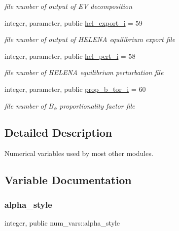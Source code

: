 \begin{DoxyCompactItemize}
\begin{DoxyCompactList}\small\item\em file number of output of EV decomposition \end{DoxyCompactList}\item 
integer, parameter, public \hyperlink{namespacenum__vars_ac781aa60ad67117abaff9737745e53f1}{hel\+\_\+export\+\_\+i} = 59
\begin{DoxyCompactList}\small\item\em file number of output of H\+E\+L\+E\+NA equilibrium export file \end{DoxyCompactList}\item 
integer, parameter, public \hyperlink{namespacenum__vars_a85c70cc05010c9efdf37551d9ec852cb}{hel\+\_\+pert\+\_\+i} = 58
\begin{DoxyCompactList}\small\item\em file number of H\+E\+L\+E\+NA equilibrium perturbation file \end{DoxyCompactList}\item 
integer, parameter, public \hyperlink{namespacenum__vars_ad4a441f0ea4a8b93fd373a6c96c918e0}{prop\+\_\+b\+\_\+tor\+\_\+i} = 60
\begin{DoxyCompactList}\small\item\em file number of $B_\phi$ proportionality factor file \end{DoxyCompactList}\end{DoxyCompactItemize}


\subsection{Detailed Description}
Numerical variables used by most other modules. 

\subsection{Variable Documentation}
\mbox{\label{namespacenum__vars_aa3b575dadc3dc227a57d52b118408d62}} 
\subsubsection{\texorpdfstring{alpha\+\_\+style}{alpha\_style}}
{\footnotesize\ttfamily integer, public num\+\_\+vars\+::alpha\+\_\+style}



